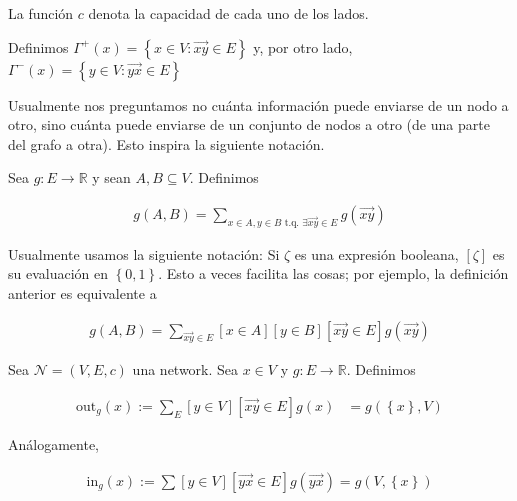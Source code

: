 \documentclass[a4paper, 12pt]{article}
\begin{document}
La función $c$ denota la capacidad de cada uno de los lados.

\begin{definition}[Vecinos]
    Definimos $\Gamma^{+}(x) = \left\{ x \in V : \overrightarrow{xy} \in E \right\} $ y,
    por otro lado,
    $\Gamma^{-}(x) = \left\{ y \in V : \overrightarrow{yx} \in E \right\} $
\end{definition}

Usualmente nos preguntamos no cuánta información puede enviarse de un nodo a
otro, sino cuánta puede enviarse de un conjunto de nodos a otro (de una parte
del grafo a otra). Esto inspira la siguiente notación.

\begin{definition}
    Sea $g : E \to \mathbb{R}$ y sean $A, B \subseteq V$. Definimos  

    \begin{align*}
        g(A, B) = \sum_{x \in A, y \in B \text{ t.q. } \exists \overrightarrow{xy} \in E}
        g(\overrightarrow{xy})
    \end{align*}
\end{definition}

Usualmente usamos la siguiente notación: Si $\zeta$ es una expresión booleana,
$[\zeta]$ es su evaluación en $\left\{ 0, 1 \right\} $. Esto a veces facilita
las cosas; por ejemplo, la definición anterior es equivalente a

\begin{align*}
    g(A, B) = \sum_{\overrightarrow{xy} \in E}[x \in A] [y \in B] [\overrightarrow{xy} \in E] g(\overrightarrow{xy})
\end{align*}

\begin{definition}
    Sea $\mathcal{N} = (V, E, c)$ una network. Sea $x \in V$ y $g : E \to
    \mathbb{R}$. Definimos 

    \begin{align*}
        \text{out}_{g}(x) := \sum_{E} [y \in V][\overrightarrow{xy} \in E]g(x) &= g \left(
        \left\{ x \right\}, V  \right) 
    \end{align*}

    Análogamente, 

    \begin{align*}
        \text{in}_g(x) := \sum[y \in V] [\overrightarrow{yx} \in E]g(\overrightarrow{yx}) = g\left( V,
        \left\{ x \right\} \right) 
    \end{align*}
\end{definition}
\end{document}
